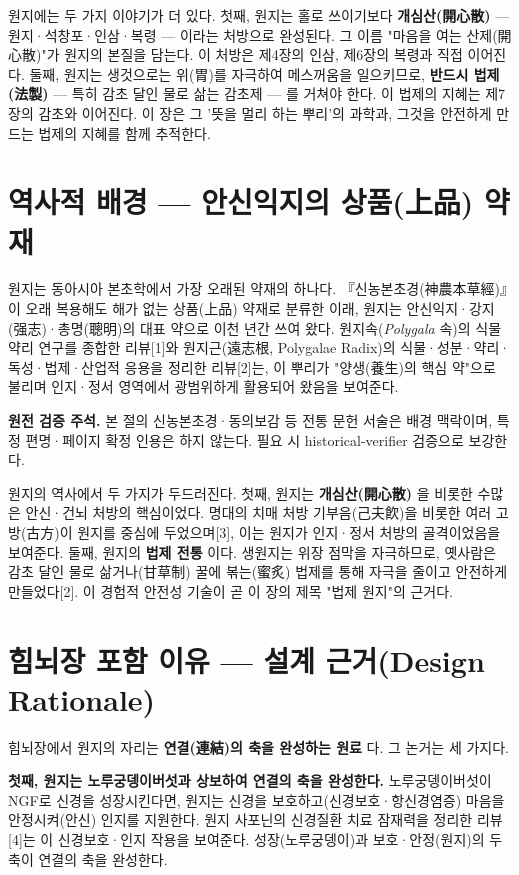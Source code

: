 \documentclass[11pt,oneside]{book}
\newenvironment{authnote}
  {\par\smallskip\begingroup\leftskip=7mm\rightskip=5mm\small\color{muted}\noindent\ignorespaces}
  {\par\endgroup\smallskip}
\begin{document}
원지에는 두 가지 이야기가 더 있다. 첫째, 원지는 홀로 쓰이기보다 \textbf{개심산(開心散)} — 원지·석창포·인삼·복령 — 이라는 처방으로 완성된다. 그 이름 "마음을 여는 산제(開心散)"가 원지의 본질을 담는다. 이 처방은 제4장의 인삼, 제6장의 복령과 직접 이어진다. 둘째, 원지는 생것으로는 위(胃)를 자극하여 메스꺼움을 일으키므로, \textbf{반드시 법제(法製)} — 특히 감초 달인 물로 삶는 감초제 — 를 거쳐야 한다. 이 법제의 지혜는 제7장의 감초와 이어진다. 이 장은 그 '뜻을 멀리 하는 뿌리'의 과학과, 그것을 안전하게 만드는 법제의 지혜를 함께 추적한다.

\section{역사적 배경 — 안신익지의 상품(上品) 약재}
원지는 동아시아 본초학에서 가장 오래된 약재의 하나다. 『신농본초경(神農本草經)』이 오래 복용해도 해가 없는 상품(上品) 약재로 분류한 이래, 원지는 안신익지·강지(强志)·총명(聰明)의 대표 약으로 이천 년간 쓰여 왔다. 원지속(\textit{Polygala} 속)의 식물약리 연구를 종합한 리뷰[1]와 원지근(遠志根, Polygalae Radix)의 식물·성분·약리·독성·법제·산업적 응용을 정리한 리뷰[2]는, 이 뿌리가 "양생(養生)의 핵심 약"으로 불리며 인지·정서 영역에서 광범위하게 활용되어 왔음을 보여준다.

\begin{authnote}\textbf{원전 검증 주석.} 본 절의 신농본초경·동의보감 등 전통 문헌 서술은 배경 맥락이며, 특정 편명·페이지 확정 인용은 하지 않는다. 필요 시 historical-verifier 검증으로 보강한다.\end{authnote}
원지의 역사에서 두 가지가 두드러진다. 첫째, 원지는 \textbf{개심산(開心散)} 을 비롯한 수많은 안신·건뇌 처방의 핵심이었다. 명대의 치매 처방 기부음(己夫飮)을 비롯한 여러 고방(古方)이 원지를 중심에 두었으며[3], 이는 원지가 인지·정서 처방의 골격이었음을 보여준다. 둘째, 원지의 \textbf{법제 전통} 이다. 생원지는 위장 점막을 자극하므로, 옛사람은 감초 달인 물로 삶거나(甘草制) 꿀에 볶는(蜜炙) 법제를 통해 자극을 줄이고 안전하게 만들었다[2]. 이 경험적 안전성 기술이 곧 이 장의 제목 "법제 원지"의 근거다.

\section{힘뇌장 포함 이유 — 설계 근거(Design Rationale)}
힘뇌장에서 원지의 자리는 \textbf{연결(連結)의 축을 완성하는 원료} 다. 그 논거는 세 가지다.

\textbf{첫째, 원지는 노루궁뎅이버섯과 상보하여 연결의 축을 완성한다.} 노루궁뎅이버섯이 NGF로 신경을 성장시킨다면, 원지는 신경을 보호하고(신경보호·항신경염증) 마음을 안정시켜(안신) 인지를 지원한다. 원지 사포닌의 신경질환 치료 잠재력을 정리한 리뷰[4]는 이 신경보호·인지 작용을 보여준다. 성장(노루궁뎅이)과 보호·안정(원지)의 두 축이 연결의 축을 완성한다.
\end{document}
